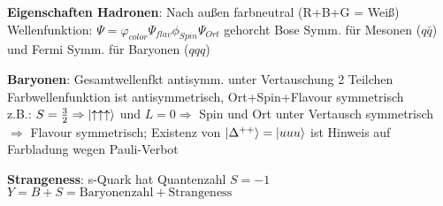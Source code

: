 \documentclass[10pt,twoside,a4paper]{article}
\begin{document}
\begin{multicols*}{3}
\textbf{Eigenschaften Hadronen}: Nach außen farbneutral (R+B+G = Weiß) \\
Wellenfunktion: $\Psi = \varphi_{color} \Psi_{flav} \phi_{Spin} \Psi_{Ort}$ gehorcht Bose Symm. für Mesonen ($q\bar{q}$) und Fermi Symm. für Baryonen ($qqq$)

\textbf{Baryonen}: Gesamtwellenfkt antisymm. unter Vertauschung 2 Teilchen \\
Farbwellenfunktion ist antisymmetrisch, Ort+Spin+Flavour symmetrisch \\
z.B.: $S = \frac{3}{2} \Rightarrow \ket{\uparrow \uparrow \uparrow}$ und $L = 0 \Rightarrow$ Spin und Ort unter Vertausch symmetrisch $\Rightarrow$ Flavour symmetrisch; Existenz von $\ket{\Delta^{++}} = \ket{uuu}$ ist Hinweis auf Farbladung wegen Pauli-Verbot

\textbf{Strangeness}: s-Quark hat Quantenzahl $S = -1$ \\
$Y = B+S = \text{Baryonenzahl} + \text{Strangeness}$
\end{multicols*}
\end{document}
